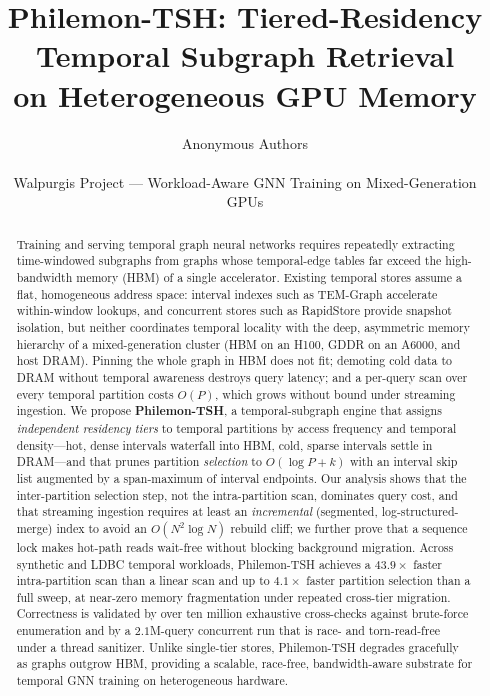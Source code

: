 \documentclass[10pt]{article}
\title{\textbf{Philemon-TSH}: Tiered-Residency Temporal Subgraph Retrieval\\
       on Heterogeneous GPU Memory}
\author{
  Anonymous Authors\\
  \\
  Walpurgis Project --- Workload-Aware GNN Training on Mixed-Generation GPUs
}
\date{}
\theoremstyle{definition}
\begin{document}
\maketitle

\begin{abstract}
Training and serving temporal graph neural networks requires repeatedly
extracting time-windowed subgraphs from graphs whose temporal-edge tables far
exceed the high-bandwidth memory (HBM) of a single accelerator. Existing
temporal stores assume a flat, homogeneous address space: interval indexes such
as TEM-Graph accelerate within-window lookups, and concurrent stores such as
RapidStore provide snapshot isolation, but neither coordinates temporal locality
with the deep, asymmetric memory hierarchy of a mixed-generation cluster
(HBM on an H100, GDDR on an A6000, and host DRAM). Pinning the whole graph in HBM
does not fit; demoting cold data to DRAM without temporal awareness destroys
query latency; and a per-query scan over every temporal partition costs $O(P)$,
which grows without bound under streaming ingestion. We propose \textbf{Philemon-TSH},
a temporal-subgraph engine that assigns \emph{independent residency tiers} to
temporal partitions by access frequency and temporal density---hot, dense
intervals waterfall into HBM, cold, sparse intervals settle in DRAM---and that
prunes partition \emph{selection} to $O(\log P + k)$ with an interval skip list
augmented by a span-maximum of interval endpoints. Our analysis shows that the
inter-partition selection step, not the intra-partition scan, dominates query
cost, and that streaming ingestion requires at least an \emph{incremental}
(segmented, log-structured-merge) index to avoid an $O(N^2\log N)$ rebuild cliff;
we further prove that a sequence lock makes hot-path reads wait-free without
blocking background migration. Across synthetic and LDBC temporal workloads,
Philemon-TSH achieves a $\mathbf{43.9\times}$ faster intra-partition scan than a
linear scan and up to $\mathbf{4.1\times}$ faster partition selection than a full
sweep, at near-zero memory fragmentation under repeated cross-tier migration.
Correctness is validated by over ten million exhaustive cross-checks against
brute-force enumeration and by a $2.1$M-query concurrent run that is race- and
torn-read-free under a thread sanitizer. Unlike single-tier stores, Philemon-TSH
degrades gracefully as graphs outgrow HBM, providing a scalable, race-free,
bandwidth-aware substrate for temporal GNN training on heterogeneous hardware.
\end{abstract}
\end{document}
